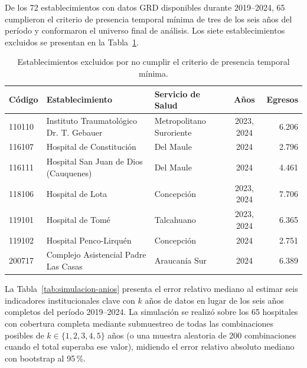 De los 72 establecimientos con datos GRD disponibles durante 2019--2024, 65
cumplieron el criterio de presencia temporal mínima de tres de los seis años del
período y conformaron el universo final de análisis. Los siete establecimientos
excluidos se presentan en la Tabla~\ref{tab:anexo-excluidos}.

\begin{table}[htbp]
\centering
\caption{Establecimientos excluidos por no cumplir el criterio de presencia temporal mínima.}
\label{tab:anexo-excluidos}
\begin{tabular}{p{1.3cm} p{4.3cm} p{3.1cm} c r}
\toprule
\textbf{Código} & \textbf{Establecimiento} & \textbf{Servicio de Salud} & \textbf{Años} & \textbf{Egresos} \\
\midrule
110110 & Instituto Traumatológico Dr. T. Gebauer & Metropolitano Suroriente & 2023, 2024 & 6.206 \\
116107 & Hospital de Constitución & Del Maule & 2024 & 2.796 \\
116111 & Hospital San Juan de Dios (Cauquenes) & Del Maule & 2024 & 4.461 \\
118106 & Hospital de Lota & Concepción & 2023, 2024 & 7.706 \\
119101 & Hospital de Tomé & Talcahuano & 2023, 2024 & 6.365 \\
119102 & Hospital Penco-Lirquén & Concepción & 2024 & 2.751 \\
200717 & Complejo Asistencial Padre Las Casas & Araucanía Sur & 2024 & 6.389 \\
\bottomrule
\end{tabular}
\end{table}

La Tabla~\ref{tab:simulacion-anios} presenta el error relativo mediano al estimar
seis indicadores institucionales clave con $k$ años de datos en lugar de los
seis años completos del período 2019--2024. La simulación se realizó sobre los
65 hospitales con cobertura completa mediante submuestreo de todas las
combinaciones posibles de $k \in \{1, 2, 3, 4, 5\}$ años (o una muestra
aleatoria de 200 combinaciones cuando el total superaba ese valor), midiendo el
error relativo absoluto mediano con bootstrap al 95\,\%.

